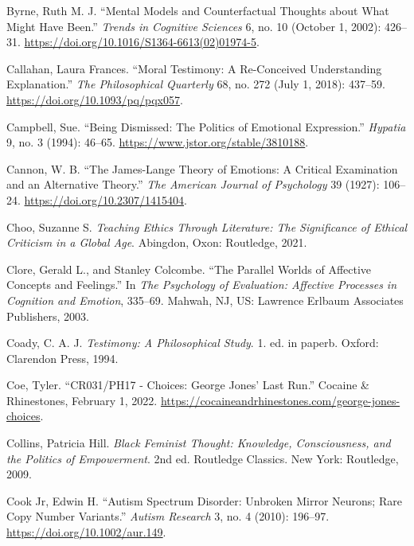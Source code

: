 \documentclass[phdthesis,12pt,final]{wuthesis}
\newlength{\cslhangindent}
\newenvironment{CSLReferences}[2] %
{\begin{list}{}{%
	\setlength{\itemindent}{0pt}
	\setlength{\leftmargin}{0pt}
	\setlength{\parsep}{0pt}
	\ifodd #1
	\setlength{\leftmargin}{\cslhangindent}
	\setlength{\itemindent}{-1\cslhangindent}
	\fi
	\setlength{\itemsep}{#2\baselineskip}}}
{\end{list}}
\theoremstyle{definition}
\theoremstyle{definition}
\theoremstyle{definition}
\theoremstyle{definition}
\theoremstyle{remark}
\begin{document}
\begin{CSLReferences}{1}{0}
Byrne, Ruth M. J. {``Mental Models and Counterfactual Thoughts about What Might Have Been.''} \emph{Trends in Cognitive Sciences} 6, no. 10 (October 1, 2002): 426--31. \url{https://doi.org/10.1016/S1364-6613(02)01974-5}.

Callahan, Laura Frances. {``Moral {Testimony}: {A Re-Conceived Understanding Explanation}.''} \emph{The Philosophical Quarterly} 68, no. 272 (July 1, 2018): 437--59. \url{https://doi.org/10.1093/pq/pqx057}.

Campbell, Sue. {``Being {Dismissed}: {The Politics} of {Emotional Expression}.''} \emph{Hypatia} 9, no. 3 (1994): 46--65. \url{https://www.jstor.org/stable/3810188}.

Cannon, W. B. {``The {James-Lange} Theory of Emotions: A Critical Examination and an Alternative Theory.''} \emph{The American Journal of Psychology} 39 (1927): 106--24. \url{https://doi.org/10.2307/1415404}.

Choo, Suzanne S. \emph{Teaching Ethics Through Literature: The Significance of Ethical Criticism in a Global Age}. Abingdon, Oxon: Routledge, 2021.

Clore, Gerald L., and Stanley Colcombe. {``The Parallel Worlds of Affective Concepts and Feelings.''} In \emph{The Psychology of Evaluation: {Affective} Processes in Cognition and Emotion}, 335--69. Mahwah, NJ, US: Lawrence Erlbaum Associates Publishers, 2003.

Coady, C. A. J. \emph{Testimony: A Philosophical Study}. 1. ed. in paperb. Oxford: Clarendon Press, 1994.

Coe, Tyler. {``{CR031}/{PH17} - {Choices}: {George Jones}' {Last Run}.''} Cocaine \& Rhinestones, February 1, 2022. \url{https://cocaineandrhinestones.com/george-jones-choices}.

Collins, Patricia Hill. \emph{Black Feminist Thought: Knowledge, Consciousness, and the Politics of Empowerment}. 2nd ed. Routledge Classics. New York: Routledge, 2009.

Cook Jr, Edwin H. {``Autism Spectrum Disorder: Unbroken Mirror Neurons; Rare Copy Number Variants.''} \emph{Autism Research} 3, no. 4 (2010): 196--97. \url{https://doi.org/10.1002/aur.149}.


\end{CSLReferences}
\end{document}
